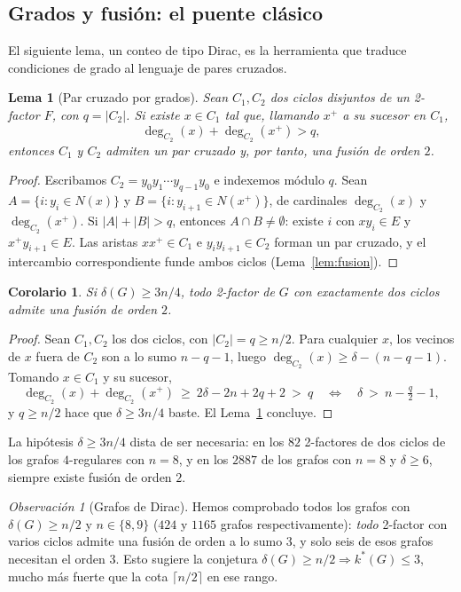 \documentclass[11pt,a4paper]{article}
\newtheorem{lema}[teorema]{Lema}
\newtheorem{corolario}[teorema]{Corolario}
\theoremstyle{definition}
\theoremstyle{remark}
\newtheorem{observacion}[teorema]{Observación}
\begin{document}
\subsection{Grados y fusión: el puente clásico}

El siguiente lema, un conteo de tipo Dirac, es la herramienta que traduce condiciones de grado al lenguaje de pares cruzados.

\begin{lema}[Par cruzado por grados]\label{lem:cruce}
Sean $C_1,C_2$ dos ciclos disjuntos de un 2-factor $F$, con $q=|C_2|$. Si existe $x\in C_1$ tal que, llamando $x^+$ a su sucesor en $C_1$,
\[
\deg_{C_2}(x)+\deg_{C_2}(x^+)>q,
\]
entonces $C_1$ y $C_2$ admiten un par cruzado y, por tanto, una fusión de orden $2$.
\end{lema}

\begin{proof}
Escribamos $C_2=y_0y_1\cdots y_{q-1}y_0$ e indexemos módulo $q$. Sean $A=\{i: y_i\in N(x)\}$ y $B=\{i: y_{i+1}\in N(x^+)\}$, de cardinales $\deg_{C_2}(x)$ y $\deg_{C_2}(x^+)$. Si $|A|+|B|>q$, entonces $A\cap B\neq\emptyset$: existe $i$ con $xy_i\in E$ y $x^+y_{i+1}\in E$. Las aristas $xx^+\in C_1$ e $y_iy_{i+1}\in C_2$ forman un par cruzado, y el intercambio correspondiente funde ambos ciclos (Lema~\ref{lem:fusion}).
\end{proof}

\begin{corolario}\label{cor:tresquartos}
Si $\delta(G)\ge 3n/4$, todo 2-factor de $G$ con exactamente dos ciclos admite una fusión de orden $2$.
\end{corolario}

\begin{proof}
Sean $C_1,C_2$ los dos ciclos, con $|C_2|=q\ge n/2$. Para cualquier $x$, los vecinos de $x$ fuera de $C_2$ son a lo sumo $n-q-1$, luego $\deg_{C_2}(x)\ge\delta-(n-q-1)$. Tomando $x\in C_1$ y su sucesor,
\[
\deg_{C_2}(x)+\deg_{C_2}(x^+)\ \ge\ 2\delta-2n+2q+2\ >\ q
\quad\Longleftrightarrow\quad
\delta\ >\ n-\tfrac{q}{2}-1 ,
\]
y $q\ge n/2$ hace que $\delta\ge 3n/4$ baste. El Lema~\ref{lem:cruce} concluye.
\end{proof}

La hipótesis $\delta\ge3n/4$ dista de ser necesaria: en los $82$ 2-factores de dos ciclos de los grafos $4$-regulares con $n=8$, y en los $2887$ de los grafos con $n=8$ y $\delta\ge6$, siempre existe fusión de orden $2$.

\begin{observacion}[Grafos de Dirac]\label{obs:dirac}
Hemos comprobado todos los grafos con $\delta(G)\ge n/2$ y $n\in\{8,9\}$ ($424$ y $1165$ grafos respectivamente): \emph{todo} 2-factor con varios ciclos admite una fusión de orden a lo sumo $3$, y solo seis de esos grafos necesitan el orden $3$. Esto sugiere la conjetura $\delta(G)\ge n/2\Rightarrow k^*(G)\le3$, mucho más fuerte que la cota $\lceil n/2\rceil$ en ese rango.
\end{observacion}
\end{document}
